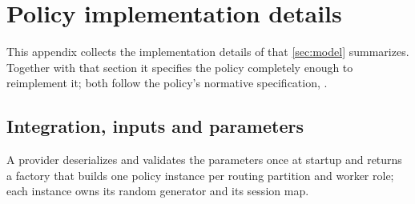%

\section{Policy implementation details}
\label{app:policy}

This appendix collects the implementation details of \lc{} that \cref{sec:model} summarizes.
Together with that section it specifies the policy completely enough to reimplement it; both follow
the policy's normative specification, .

\subsection{Integration, inputs and parameters}

A provider deserializes and validates the parameters once at startup and returns a factory that
builds one policy instance per routing partition and worker role; each instance owns its random
generator and its session map.

